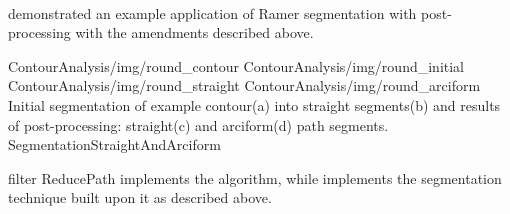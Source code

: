 \paragraph*{}
 demonstrated an example application of Ramer segmentation with post-processing with the amendments described above.

\fourFigures
{ContourAnalysis/img/round_contour}
{ContourAnalysis/img/round_initial}
{ContourAnalysis/img/round_straight}
{ContourAnalysis/img/round_arciform}
{Initial segmentation of example contour(a) into straight segments(b) and results of post-processing: straight(c) and arciform(d) path segments.}
{SegmentationStraightAndArciform}
{\basicWidth}

\begin{refImpl}
\studio filter ReducePath implements the  algorithm, while  implements the segmentation technique built upon it as described above.
\end{refImpl}